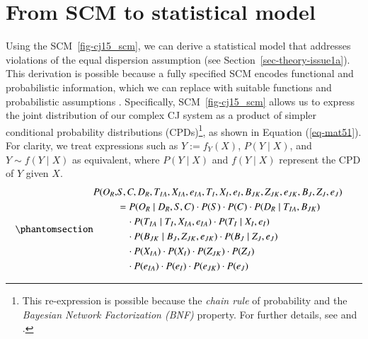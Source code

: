 \documentclass[
  authoryear,
  review,
  1p]{elsarticle}
\begin{document}
\section{From SCM to statistical model}\label{sec-statistical}

Using the SCM~\ref{fig-cj15_scm}, we can derive a statistical model that
addresses violations of the equal dispersion assumption (see
Section~\ref{sec-theory-issue1a}). This derivation is possible because a
fully specified SCM encodes functional and probabilistic information,
which we can replace with suitable functions and probabilistic
assumptions \citep{Pearl_et_al_2016}. Specifically,
SCM~\ref{fig-cj15_scm} allows us to express the joint distribution of
our complex CJ system as a product of simpler conditional probability
distributions (CPDs)\footnote{This re-expression is possible because the
  \emph{chain rule} of probability and the \emph{Bayesian Network
  Factorization (BNF)} property. For further details, see
  \citet{Pearl_et_al_2016} and \citet{Neal_2020}.}, as shown in Equation
(\ref{eq-mat51}). For clarity, we treat expressions such as
\(Y := f_{Y}(X)\), \(P(Y \mid X)\), and \(Y \sim f(Y \mid X)\) as
equivalent, where \(P(Y \mid X)\) and \(f(Y \mid X)\) represent the CPD
of \(Y\) given \(X\). \begin{equation}\phantomsection\label{eq-mat51}{
\begin{aligned}
  P(O_{R}, & S, C, D_{R}, T_{IA}, X_{IA}, e_{IA}, T_{I}, X_{I}, e_{I}, B_{JK}, Z_{JK}, e_{JK}, B_{J}, Z_{J}, e_{J} ) & \\
  &= P(O_{R} \mid D_{R}, S, C) \cdot P(S) \cdot P(C) \cdot P(D_{R} \mid T_{IA}, B_{JK}) \\
  & \quad \cdot P(T_{IA} \mid T_{I}, X_{IA}, e_{IA}) \cdot P(T_{I} \mid X_{I}, e_{I}) \\
  & \quad \cdot P(B_{JK} \mid B_{J}, Z_{JK}, e_{JK}) \cdot P(B_{J} \mid Z_{J}, e_{J}) \\
  & \quad \cdot P(X_{IA}) \cdot P(X_{I}) \cdot P(Z_{JK}) \cdot P(Z_{J}) \\
  & \quad \cdot P(e_{IA}) \cdot P(e_{I}) \cdot P(e_{JK}) \cdot P(e_{J})  
\end{aligned}
}\end{equation}
\end{document}
